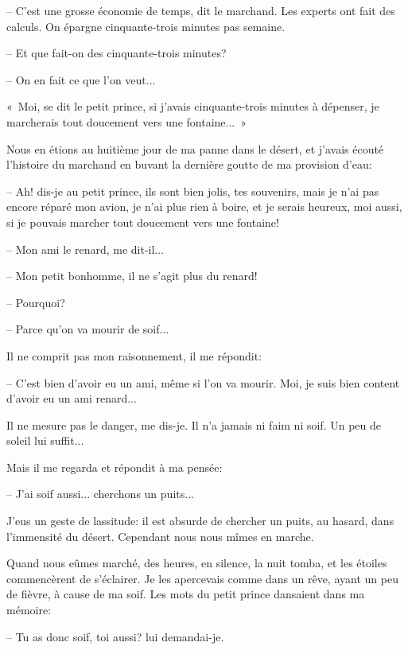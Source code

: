 \documentclass[a4paper]{report}
\begin{document}
-- C'est une grosse économie de temps, dit le marchand. Les experts ont fait des calculs. On épargne cinquante-trois minutes pas semaine.

-- Et que fait-on des cinquante-trois minutes?

-- On en fait ce que l'on veut...

«~Moi, se dit le petit prince, si j'avais cinquante-trois minutes à dépenser, je marcherais tout doucement vers une fontaine...~»


\parachapter[XXIV]{} %
Nous en étions au huitième jour de ma panne dans le désert, et j'avais écouté l'histoire du marchand en buvant la dernière goutte de ma provision d'eau:

-- Ah! dis-je au petit prince, ils sont bien jolis, tes souvenirs, mais je n'ai pas encore réparé mon avion, je n'ai plus rien à boire, et je serais heureux, moi aussi, si je pouvais marcher tout doucement vers une fontaine!

-- Mon ami le renard, me dit-il...

-- Mon petit bonhomme, il ne s'agit plus du renard!

-- Pourquoi?

-- Parce qu'on va mourir de soif...

Il ne comprit pas mon raisonnement, il me répondit:

-- C'est bien d'avoir eu un ami, même si l'on va mourir. Moi, je suis bien content d'avoir eu un ami renard...

Il ne mesure pas le danger, me dis-je. Il n'a jamais ni faim ni soif. Un peu de soleil lui suffit...

Mais il me regarda et répondit à ma pensée:

-- J'ai soif aussi... cherchons un puits...

J'eus un geste de lassitude: il est absurde de chercher un puits, au hasard, dans l'immensité du désert. Cependant nous nous mîmes\ft[metre]{}{} en marche.

Quand nous eûmes marché, des heures, en silence, la nuit tomba, et les étoiles commencèrent de s'éclairer. Je les apercevais comme dans un rêve, ayant un peu de fièvre, à cause de ma soif. Les mots du petit prince dansaient dans ma mémoire:

-- Tu as donc soif, toi aussi? lui demandai-je.
\end{document}
